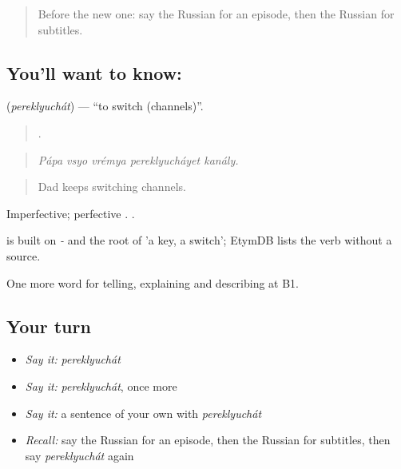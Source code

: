 \label{lesson:RU-C527-pereklyuchat}



\begin{quote}
Before the new one: say the Russian for an episode, then the Russian for subtitles.
\end{quote}

\subsection*{You'll want to know: }
\textbf{} (\emph{pereklyuchát}) — \textquotedblleft{}to switch (channels)\textquotedblright{}.

\begin{quote}
    .
\end{quote}

\begin{quote}
\emph{Pápa vsyo vrémya pereklyucháyet kanály.}
\end{quote}

\begin{quote}
Dad keeps switching channels.
\end{quote}

Imperfective; perfective . \emph{   }.

\begin{cousinweb}
\emph{} is built on \emph{-} and the root of \emph{} 'a key, a switch'; EtymDB lists the verb without a source.
\end{cousinweb}

\begin{grammarlens}[title={What you've built}]
One more word for telling, explaining and describing at B1.
\end{grammarlens}

\subsection*{Your turn}
\begin{itemize}
\raggedright
  \item \emph{Say it:} \emph{pereklyuchát}
  \item \emph{Say it:} \emph{pereklyuchát}, once more
  \item \emph{Say it:} a sentence of your own with \emph{pereklyuchát}
  \item \emph{Recall:} say the Russian for an episode, then the Russian for subtitles, then say \emph{pereklyuchát} again
\end{itemize}

